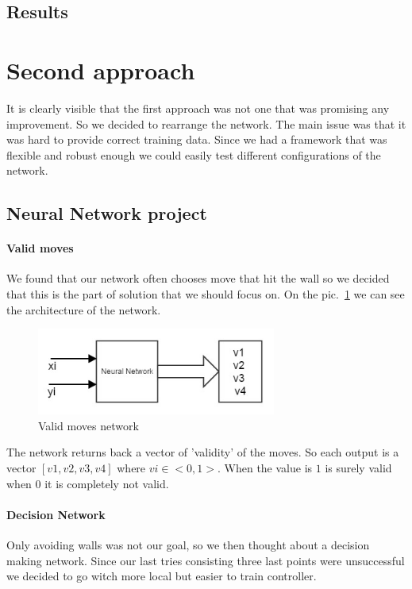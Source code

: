 \documentclass[a4paper]{article}
\begin{document}
	 

	\subsection{Results}
	

\section{Second approach}
	It is clearly visible that the first approach was not one that was promising any improvement. So we decided to rearrange the network. The main issue was that it was hard to provide correct training data. Since we had a framework that was flexible and robust enough we could easily test different configurations of the network.
\subsection{Neural Network project}
\paragraph{Valid moves}
	We found that our network often chooses move that hit the wall so we decided that this is the part of solution that we should focus on. On the pic.~\ref{pic:validMoves} we can see the architecture of the network.

\begin{figure}[!h]
		\centering	
		\includegraphics[width=0.7\textwidth]{pic/validMoves.jpg}
		\caption{Valid moves network}
		\label{pic:validMoves}
	\end{figure}
	
	The network returns back a vector of 'validity' of the moves. So each output is a vector $[v1,v2,v3,v4]$ where $vi\in <0,1>$. When the value is $1$ is surely valid when $0$ it is completely not valid.	
\paragraph{Decision Network}
Only avoiding walls was not our goal, so we then thought about a decision making network. Since our last tries consisting three last points were unsuccessful we decided to go witch more local but easier to train controller.
\end{document}
